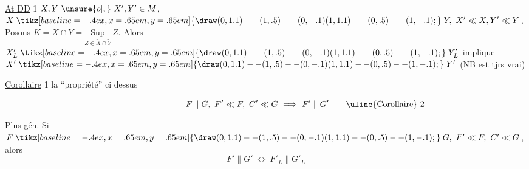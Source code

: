 \uline{At DD} 1  $X,Y\ \unsure{o|,}\ X',Y'\in M$, $X\mathrel{\tikz[baseline=-.4ex,x=.65em,y=.65em]{\draw (0,1.1)--(1,.5)--(0,-.1) (1,1.1)--(0,.5)--(1,-.1);}}Y,\ X'\ll X,Y'\ll Y$. Posons $K=X\cap Y=\underset{Z\in\widetilde X\cap\widetilde Y}{\mathrm{Sup}}\,Z$. Alors $X'_{L}\mathrel{\tikz[baseline=-.4ex,x=.65em,y=.65em]{\draw (0,1.1)--(1,.5)--(0,-.1) (1,1.1)--(0,.5)--(1,-.1);}}Y'_{L}$ implique $X'\mathrel{\tikz[baseline=-.4ex,x=.65em,y=.65em]{\draw (0,1.1)--(1,.5)--(0,-.1) (1,1.1)--(0,.5)--(1,-.1);}}Y'$ \quad (NB   est tjrs vrai)

\uline{Corollaire} 1 \quad la ``propriété'' ci dessus

\[
F\parallel G,\ F'\ll F,\ C'\ll G\ \Longrightarrow\ F'\parallel G'
\tag*{\makebox[0pt][r]{\makebox[\displaywidth][l]{\uline{Corollaire} 2}}}
\]

Plus gén. \quad Si $F\mathrel{\tikz[baseline=-.4ex,x=.65em,y=.65em]{\draw (0,1.1)--(1,.5)--(0,-.1) (1,1.1)--(0,.5)--(1,-.1);}}G,\ F'\ll F,\ C'\ll G$, alors
\[
 F'\parallel G'\ \Longleftrightarrow\ F'_{L}\parallel G'_{L}
\]
